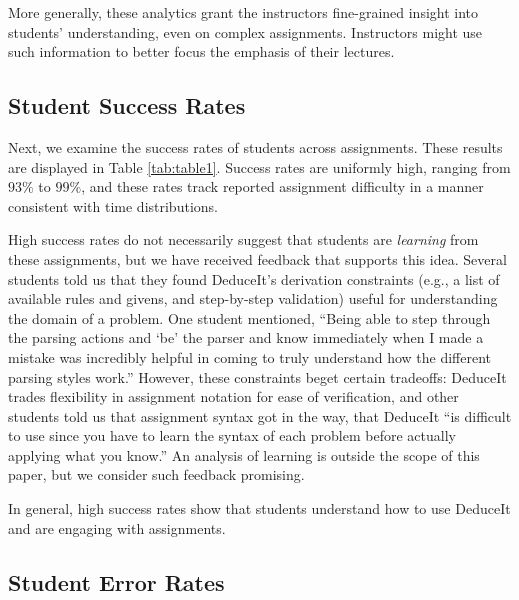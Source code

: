 \documentclass{sigchi}
\newcommand{\msb}[1]{\textbf{\textcolor{cyan}{Michael: #1}}}
\begin{document}
More generally, these analytics grant the instructors fine-grained insight into students' understanding, even on complex assignments. Instructors might use such information to better focus the emphasis of their lectures.

\subsection{Student Success Rates}

Next, we examine the success rates of students across assignments. These results are displayed in Table \ref{tab:table1}. Success rates are uniformly high, ranging from $93\%$ to $99\%$, and these rates track reported assignment difficulty in a manner consistent with time distributions. %

High success rates do not necessarily suggest that students are \textit{learning} from these assignments, but we have received feedback that supports this idea. Several students told us that they found DeduceIt's derivation constraints (e.g., a list of available rules and givens, and step-by-step validation) useful for understanding the domain of a problem. One student mentioned, ``Being able to step through the parsing actions and `be' the parser and know immediately when I made a mistake was incredibly helpful in coming to truly understand how the different parsing styles work.'' However, these constraints beget certain tradeoffs: DeduceIt trades flexibility in assignment notation for ease of verification, and other students told us that assignment syntax got in the way, that DeduceIt ``is difficult to use since you have to learn the syntax of each problem before actually applying what you know.'' An analysis of learning is outside the scope of this paper, but we consider such feedback promising.

In general, high success rates show that students understand how to use DeduceIt and are engaging with assignments.

\subsection{Student Error Rates}
\end{document}
